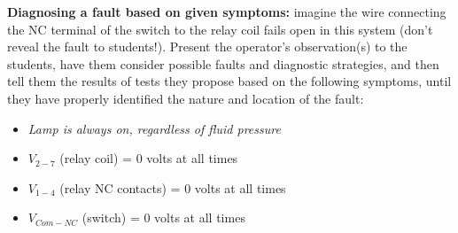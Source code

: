 \vskip 10pt


\noindent
{\bf Diagnosing a fault based on given symptoms:} imagine the wire connecting the NC terminal of the switch to the relay coil fails open in this system (don't reveal the fault to students!).  Present the operator's observation(s) to the students, have them consider possible faults and diagnostic strategies, and then tell them the results of tests they propose based on the following symptoms, until they have properly identified the nature and location of the fault:

\begin{itemize}
\item{} {\it Lamp is always on, regardless of fluid pressure}
\item{} $V_{2-7}$ (relay coil) = 0 volts at all times
\item{} $V_{1-4}$ (relay NC contacts) = 0 volts at all times
\item{} $V_{Com-NC}$ (switch) = 0 volts at all times
\end{itemize}




